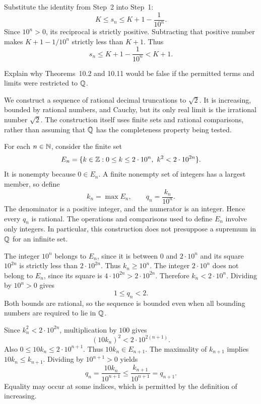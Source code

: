 Substitute the identity from Step~2 into Step~1:
\[
 K\le s_n\le K+1-\frac1{10^n}.
\]
Since $10^n>0$, its reciprocal is strictly positive. Subtracting that
positive number makes $K+1-1/10^n$ strictly less than $K+1$. Thus
\[
 s_n\le K+1-\frac1{10^n}<K+1.
\]



\goal Explain why Theorems~10.2 and 10.11 would be false if the
permitted terms and limits were restricted to $\mathbb{Q}$.

\idea We construct a sequence of rational decimal truncations to
$\sqrt2$. It is increasing, bounded by rational numbers, and Cauchy,
but its only real limit is the irrational number $\sqrt2$. The
construction itself uses finite sets and rational comparisons, rather
than assuming that $\mathbb{Q}$ has the completeness property being tested.

For each $n\in\mathbb{N}$, consider the finite set
\[
 E_n=\{k\in\mathbb{Z}:0\le k\le2\cdot10^n,
                   \ k^2<2\cdot10^{2n}\}.
\]
It is nonempty because $0\in E_n$. A finite nonempty set of integers
has a largest member, so define
\[
 k_n=\max E_n,\qquad q_n=\frac{k_n}{10^n}.
\]
The denominator is a positive integer, and the numerator is an
integer. Hence every $q_n$ is rational.
The operations and comparisons used to define $E_n$ involve only
integers. In particular, this construction does not presuppose a
supremum in $\mathbb{Q}$ for an infinite set.

The integer $10^n$ belongs to $E_n$, since it is between $0$ and
$2\cdot10^n$ and its square $10^{2n}$ is strictly less than
$2\cdot10^{2n}$. Thus $k_n\ge10^n$.
The integer $2\cdot10^n$ does not belong to $E_n$, since its square
is $4\cdot10^{2n}>2\cdot10^{2n}$. Therefore $k_n<2\cdot10^n$.
Dividing by $10^n>0$ gives
\[
 1\le q_n<2.
\]
Both bounds are rational, so the sequence is bounded even when all
bounding numbers are required to lie in $\mathbb{Q}$.

Since $k_n^2<2\cdot10^{2n}$, multiplication by $100$ gives
\[
 (10k_n)^2<2\cdot10^{2(n+1)}.
\]
Also $0\le10k_n\le2\cdot10^{n+1}$. Thus $10k_n\in E_{n+1}$.
The maximality of $k_{n+1}$ implies $10k_n\le k_{n+1}$.
Dividing by $10^{n+1}>0$ yields
\[
 q_n=\frac{10k_n}{10^{n+1}}\le
      \frac{k_{n+1}}{10^{n+1}}=q_{n+1}.
\]
Equality may occur at some indices, which is permitted by the
definition of increasing.

